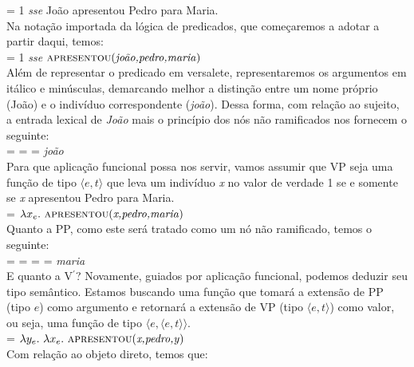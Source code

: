 \noindent {} = 1 \textit{sse} João apresentou Pedro para
Maria.\\

\n Na notação importada da lógica de predicados, que começaremos a adotar a partir daqui, temos:\\

\noindent {} = 1 \textit{sse} $\text{\textsc{apresentou}(\textit{joão,pedro,maria})}$\\


\noindent Além de representar o predicado em versalete, representaremos os argumentos em itálico e minúsculas, demarcando melhor a distinção entre um nome próprio (João) e o indivíduo correspondente (\textit{joão}). Dessa forma, com relação ao sujeito, a entrada lexical de \textit{João}
mais o princípio dos nós não ramificados nos fornecem o
seguinte:\\

\noindent {} =  =  = \textit{joão}\\

\noindent Para que aplicação funcional possa nos servir, vamos
assumir que VP seja uma função de tipo $\langle e,t \rangle$ que
leva um indivíduo \textit{x} no valor de verdade 1 se e somente se
\textit{x} apresentou Pedro para Maria.\\

\noindent {} = $\lambda x_{e}.\ \predica{apresentou}{x,pedro,maria}$\\

\noindent Quanto a PP, como este será tratado como um nó não
ramificado, temos o seguinte:\\

\noindent {} =  =  =  =
\textit{maria}\\

\noindent E quanto a V$^{\prime}$? Novamente, guiados por aplicação
funcional, podemos deduzir seu tipo semântico. Estamos
buscando uma função que tomará a extensão de PP (tipo $e$) como
argumento e retornará a extensão de VP (tipo
$\langle e,t \rangle$) como valor, ou seja, uma função de tipo
$\langle e, \langle e,t \rangle\rangle$.\\

\noindent {} = $\lambda y_{e}.\ \lambda x_{e}.\ \predica{apresentou}{x,pedro,y}$\\

\noindent Com relação ao objeto direto, temos que: \\

